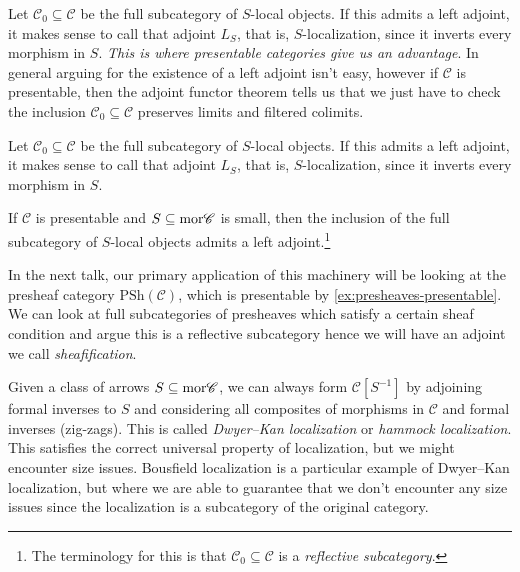\documentclass[11pt]{amsart}
\renewcommand{\Pre}{\mathrm{PSh}}
\begin{document}
\begin{remark} Let $\mathscr{C}_0 \subseteq \mathscr{C}$ be the full subcategory of $S$-local objects. If this admits a left adjoint, it makes sense to call that adjoint $L_S$, that is, $S$-localization, since it inverts every morphism in $S$. \textit{This is where presentable categories give us an advantage}. In general arguing for the existence of a left adjoint isn't easy, however if $\mathscr{C}$ is presentable, then the adjoint functor theorem tells us that we just have to check the inclusion $\mathscr{C}_0 \subseteq \mathscr{C}$ preserves limits and filtered colimits.
\end{remark}
Let $\mathscr{C}_0 \subseteq \mathscr{C}$ be the full subcategory of $S$-local objects. If this admits a left adjoint, it makes sense to call that adjoint $L_S$, that is, $S$-localization, since it inverts every morphism in $S$.

\begin{proposition}\label{prop:localization-at-set-of-morphisms} 
\cite[5.5.4.15]{HTT} If $\mathscr{C}$ is presentable and $S \subseteq \mathrm{mor} \mathscr{C}$ is small, then the inclusion of the full subcategory of $S$-local objects admits a left adjoint.\footnote{The terminology for this is that $\mathscr{C}_0 \subseteq \mathscr{C}$ is a \textit{reflective subcategory}.}
\end{proposition}

\begin{example} In the next talk, our primary application of this machinery will be looking at the presheaf category $\Pre(\mathscr{C})$, which is presentable by \autoref{ex:presheaves-presentable}. We can look at full subcategories of presheaves which satisfy a certain sheaf condition and argue this is a reflective subcategory hence we will have an adjoint we call \textit{sheafification}.
\end{example}

\begin{remark} Given a class of arrows $S \subseteq \mathrm{mor} \mathscr{C}$, we can always form $\mathscr{C}[S^{-1}]$ by adjoining formal inverses to $S$ and considering all composites of morphisms in $\mathscr{C}$ and formal inverses (zig-zags). This is called \textit{Dwyer--Kan localization} or \textit{hammock localization}. This satisfies the correct universal property of localization, but we might encounter size issues. Bousfield localization is a particular example of Dwyer--Kan localization, but where we are able to guarantee that we don't encounter any size issues since the localization is a subcategory of the original category.
\end{remark}
\end{document}
